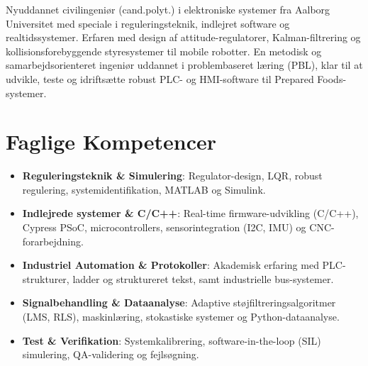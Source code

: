 \documentclass[11pt,a4paper,sans]{moderncv}
\begin{document}
\makecvtitle


\vspace{6pt}
\small{Nyuddannet civilingeniør (cand.polyt.) i elektroniske systemer fra Aalborg Universitet med speciale i reguleringsteknik, indlejret software og realtidssystemer. Erfaren med design af attitude-regulatorer, Kalman-filtrering og kollisionsforebyggende styresystemer til mobile robotter. En metodisk og samarbejdsorienteret ingeniør uddannet i problembaseret læring (PBL), klar til at udvikle, teste og idriftsætte robust PLC- og HMI-software til Prepared Foods-systemer.}


\section{Faglige Kompetencer}
\vspace{1pt}
\begin{itemize}

\item \textbf{Reguleringsteknik \& Simulering}: Regulator-design, LQR, robust regulering, systemidentifikation, MATLAB og Simulink.

\item \textbf{Indlejrede systemer \& C/C++}: Real-time firmware-udvikling (C/C++), Cypress PSoC, microcontrollers, sensorintegration (I2C, IMU) og CNC-forarbejdning.

\item \textbf{Industriel Automation \& Protokoller}: Akademisk erfaring med PLC-strukturer, ladder og struktureret tekst, samt industrielle bus-systemer.

\item \textbf{Signalbehandling \& Dataanalyse}: Adaptive støjfiltreringsalgoritmer (LMS, RLS), maskinlæring, stokastiske systemer og Python-dataanalyse.

\item \textbf{Test \& Verifikation}: Systemkalibrering, software-in-the-loop (SIL) simulering, QA-validering og fejlsøgning.

\end{itemize}

\end{document}

